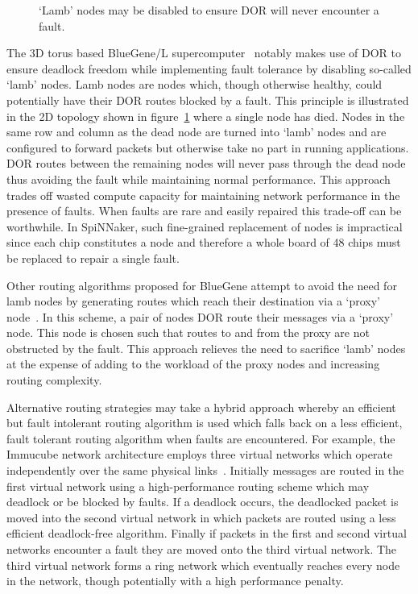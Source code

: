 			\begin{figure}
				\center
				
				\caption[Avoiding faults using `lamb' nodes and DOR.]%
				{`Lamb' nodes may be disabled to ensure DOR will never
				encounter a fault.}
				\label{fig:lamb-nodes}
			\end{figure}
			
			The 3D torus based BlueGene/L supercomputer~\cite{adiga02} notably makes
			use of DOR to ensure deadlock freedom while implementing fault tolerance
			by disabling so-called `lamb' nodes. Lamb nodes are nodes which, though
			otherwise healthy, could potentially have their DOR routes blocked by a
			fault. This principle is illustrated in the 2D topology shown in
			figure~\ref{fig:lamb-nodes} where a single node has died. Nodes in the
			same row and column as the dead node are turned into `lamb' nodes and are
			configured to forward packets but otherwise take no part in running
			applications. DOR routes between the remaining nodes will never pass
			through the dead node thus avoiding the fault while maintaining normal
			performance. This approach trades off wasted compute capacity for
			maintaining network performance in the presence of faults. When faults
			are rare and easily repaired this trade-off can be worthwhile. In
			SpiNNaker, such fine-grained replacement of nodes is impractical since
			each chip constitutes a node and therefore a whole board of 48 chips must
			be replaced to repair a single fault.
			
			Other routing algorithms proposed for BlueGene attempt to avoid the need
			for lamb nodes by generating routes which reach their destination via a
			`proxy' node~\cite{gomez04}. In this scheme, a pair of nodes DOR route
			their messages via a `proxy' node.  This node is chosen such that routes
			to and from the proxy are not obstructed by the fault.  This approach
			relieves the need to sacrifice `lamb' nodes at the expense of adding to
			the workload of the proxy nodes and increasing routing complexity.
			
			Alternative routing strategies may take a hybrid approach whereby an
			efficient but fault intolerant routing algorithm is used which falls back
			on a less efficient, fault tolerant routing algorithm when faults are
			encountered. For example, the Immucube network architecture employs three
			virtual networks which operate independently over the same physical
			links~\cite{puente07}. Initially messages are routed in the first virtual
			network using a high-performance routing scheme which may deadlock or be
			blocked by faults.  If a deadlock occurs, the deadlocked packet is moved
			into the second virtual network in which packets are routed using a less
			efficient deadlock-free algorithm. Finally if packets in the first and
			second virtual networks encounter a fault they are moved onto the third
			virtual network. The third virtual network forms a ring network which
			eventually reaches every node in the network, though potentially with a
			high performance penalty.
			
